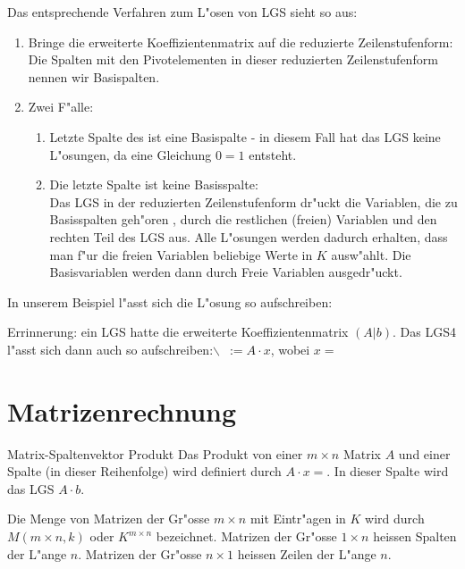 \documentclass[fontsize=11pt,paper=a4,BCOR=0mm,DIV=11,automark,headsepline]{scrbook}
\theoremstyle{remark}
\theoremstyle{definition}
\theoremstyle{proof}
\theoremstyle{remark}
\begin{document}
Das entsprechende Verfahren zum L"osen von LGS sieht so aus:
\begin{relation}
\begin{enumerate}
\item Bringe die erweiterte Koeffizientenmatrix auf die reduzierte
Zeilenstufenform: \\
Die Spalten mit den Pivotelementen in dieser reduzierten Zeilenstufenform
nennen wir Basispalten.
\item Zwei F"alle:
\begin{enumerate}
\item Letzte Spalte des ist eine Basispalte - in diesem Fall hat das LGS keine
L"osungen, da eine Gleichung \(0=1\) entsteht.
\item Die letzte Spalte ist keine Basisspalte: \\
Das LGS in der reduzierten Zeilenstufenform dr"uckt die Variablen, die zu
Basisspalten geh"oren , durch die restlichen (freien) Variablen und den
rechten Teil des LGS aus. Alle L"osungen werden dadurch erhalten, dass
man f"ur die freien Variablen beliebige Werte in \(K\) ausw"ahlt. Die
Basisvariablen werden dann durch Freie Variablen ausgedr"uckt.
\end{enumerate}
\end{enumerate}
\end{relation}

In unserem Beispiel l"asst sich die L"osung so aufschreiben: 


Errinnerung: ein LGS hatte die erweiterte Koeffizientenmatrix \((A|b)\). Das LGS4
l"asst sich dann auch so aufschreiben:$\backslash$\ \(:=A\cdot x\), wobei \(x=\)


\section{Matrizenrechnung}
\label{sec:org0f3e63e}
\begin{definition}{Matrix-Spaltenvektor Produkt}{}
Das Produkt von einer \(m\times n\) Matrix \(A\) und einer Spalte (in dieser
Reihenfolge) wird definiert durch \(A\cdot x =\). In dieser Spalte wird das LGS
\(A\cdot b\).
\end{definition}

Die Menge von Matrizen der Gr"osse \(m\times n\) mit Eintr"agen in \(K\) wird durch
\(M(m\times n, k)\) oder \(K^{m\times n}\) bezeichnet. Matrizen der Gr"osse \(1\times
n\) heissen Spalten der L"ange \(n\). Matrizen der Gr"osse \(n\times 1\) heissen
Zeilen der L"ange \(n\).
\end{document}
